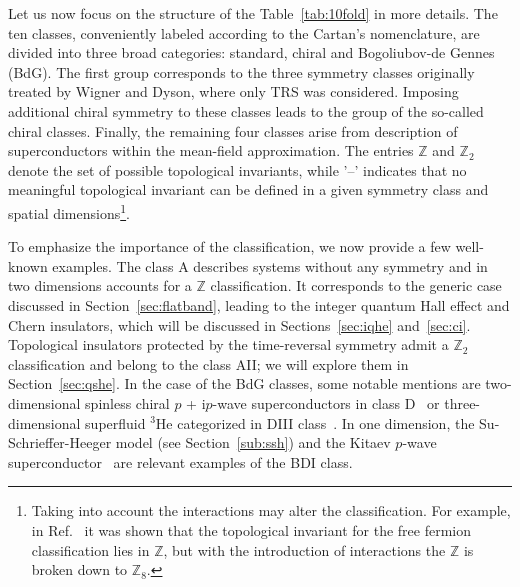 Let us now focus on the structure of the Table~\ref{tab:10fold} in more details. The ten classes, conveniently labeled according to the Cartan's nomenclature, are divided into three broad categories: standard, chiral and Bogoliubov-de Gennes (BdG). The first group corresponds to the three symmetry classes originally treated by Wigner and Dyson, where only TRS was considered. Imposing additional chiral symmetry to these classes leads to the group of the so-called chiral classes. Finally, the remaining four classes arise from description of superconductors within the mean-field approximation. The entries $\mathbb{Z}$ and $\mathbb{Z}_2$ denote the set of possible topological invariants, while '--' indicates that no meaningful topological invariant can be defined in a given symmetry class and spatial dimensions\footnote{Taking into account the interactions may alter the classification. For example, in Ref.~\cite{PhysRevB.81.134509} it was shown that the topological invariant for the free fermion classification lies in $\mathbb{Z}$, but with the introduction of interactions the $\mathbb{Z}$ is broken down to $\mathbb{Z}_8$.}.

To emphasize the importance of the classification, we now provide a few well-known examples. The class A describes systems without any symmetry and in two dimensions accounts for a $\mathbb{Z}$ classification. It corresponds to the generic case discussed in Section~\ref{sec:flatband}, leading to the integer quantum Hall effect and Chern insulators, which will be discussed in Sections~\ref{sec:iqhe} and~\ref{sec:ci}. Topological insulators protected by the time-reversal symmetry admit a $\mathbb{Z}_2$ classification and belong to the class AII; we will explore them in Section~\ref{sec:qshe}. In the case of the BdG classes, some notable mentions are two-dimensional spinless chiral $p$ + i$p$-wave superconductors in class D~\cite{TSCRead2000} or three-dimensional superfluid $^{3}$He categorized in DIII class~\cite{Mizushima_2015}. In one dimension, the Su-Schrieffer-Heeger model (see Section~\ref{sub:ssh}) and the Kitaev $p$-wave superconductor~\cite{Kitaev_2001} are relevant examples of the BDI class.

